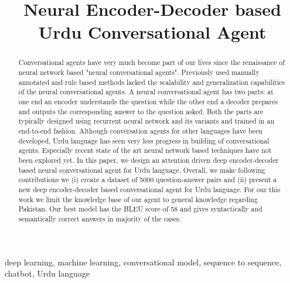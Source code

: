 \documentclass[conference]{IEEEtran}
\begin{document}
\title{Neural Encoder-Decoder based Urdu Conversational Agent\\
}

\author{
\and
{}
}

\maketitle

\begin{abstract}
Conversational agents have very much become part of our lives since the renaissance of neural network based "neural conversational agents". Previously used manually annotated and rule based methods lacked the scalability and generalization capabilities of the neural conversational agents. A neural conversational agent has two parts: at one end an encoder understands the question while the other  end a decoder prepares and outputs the corresponding answer to the question asked. Both the parts are typically designed using recurrent neural network and its variants and trained  in an end-to-end fashion. Although conversation agents for other languages have been developed,  Urdu language has seen very less progress in building of conversational agents. Especially recent state of the art neural network based techniques have not been explored yet. In this paper, we design an attention driven deep encoder-decoder based neural conversational agent for Urdu language. Overall, we make following contributions we (i) create a dataset of 5000 question-answer pairs  and (ii)  present a new deep encoder-decoder based conversational agent for Urdu language. For our this work  we limit the knowledge base of our agent to general knowledge regarding Pakistan. Our best model has the BLEU score of 58 and gives syntactically and semantically correct answers in majority of the cases.
\end{abstract}

\begin{IEEEkeywords}
deep learning, machine learning, conversational model, sequence to sequence, chatbot, Urdu language
\end{IEEEkeywords}
\end{document}
